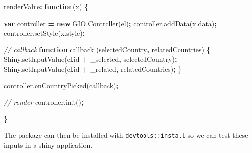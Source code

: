 \documentclass[
]{krantz}
\makeatletter
\newenvironment{Shaded}{\begin{snugshade}}{\end{snugshade}}
\newcommand{\AttributeTok}[1]{\textcolor[rgb]{0.61,0.61,0.61}{#1}}
\newcommand{\CommentTok}[1]{\textcolor[rgb]{0.37,0.37,0.37}{\textit{#1}}}
\newcommand{\KeywordTok}[1]{\textcolor[rgb]{0.27,0.27,0.27}{\textbf{#1}}}
\newcommand{\NormalTok}[1]{#1}
\newcommand{\OperatorTok}[1]{\textcolor[rgb]{0.43,0.43,0.43}{\textbf{#1}}}
\newcommand{\StringTok}[1]{\textcolor[rgb]{0.5,0.5,0.5}{#1}}
\newcommand{\VariableTok}[1]{\textcolor[rgb]{0,0,0}{#1}}
\newenvironment{kframe}{%
\medskip{}
\setlength{\fboxsep}{.8em}
 \def\at@end@of@kframe{}%
 \ifinner\ifhmode%
  \def\at@end@of@kframe{\end{minipage}}%
  \begin{minipage}{\columnwidth}%
 \fi\fi%
 \def\FrameCommand##1{\hskip\@totalleftmargin \hskip-\fboxsep
 \colorbox{shadecolor}{##1}\hskip-\fboxsep
     \hskip-\linewidth \hskip-\@totalleftmargin \hskip\columnwidth}%
 \MakeFramed {\advance\hsize-\width
   \@totalleftmargin\z@ \linewidth\hsize
   \@setminipage}}%
 {\par\unskip\endMakeFramed%
 \at@end@of@kframe}
\renewenvironment{Shaded}{\begin{kframe}}{\end{kframe}}
\makeatother
\begin{document}
\begin{Shaded}
\begin{Highlighting}[]
\NormalTok{renderValue}\OperatorTok{:} \KeywordTok{function}\NormalTok{(x) }\OperatorTok{\{}

  \KeywordTok{var}\NormalTok{ controller }\OperatorTok{=} \KeywordTok{new} \VariableTok{GIO}\NormalTok{.}\AttributeTok{Controller}\NormalTok{(el)}\OperatorTok{;}
  \VariableTok{controller}\NormalTok{.}\AttributeTok{addData}\NormalTok{(}\VariableTok{x}\NormalTok{.}\AttributeTok{data}\NormalTok{)}\OperatorTok{;}
  \VariableTok{controller}\NormalTok{.}\AttributeTok{setStyle}\NormalTok{(}\VariableTok{x}\NormalTok{.}\AttributeTok{style}\NormalTok{)}\OperatorTok{;}

  \CommentTok{// callback}
  \KeywordTok{function} \AttributeTok{callback}\NormalTok{ (selectedCountry}\OperatorTok{,}\NormalTok{ relatedCountries) }\OperatorTok{\{}
    \VariableTok{Shiny}\NormalTok{.}\AttributeTok{setInputValue}\NormalTok{(}\VariableTok{el}\NormalTok{.}\AttributeTok{id} \OperatorTok{+} \StringTok{\textquotesingle{}\_selected\textquotesingle{}}\OperatorTok{,}\NormalTok{ selectedCountry)}\OperatorTok{;}
    \VariableTok{Shiny}\NormalTok{.}\AttributeTok{setInputValue}\NormalTok{(}\VariableTok{el}\NormalTok{.}\AttributeTok{id} \OperatorTok{+} \StringTok{\textquotesingle{}\_related\textquotesingle{}}\OperatorTok{,}\NormalTok{ relatedCountries)}\OperatorTok{;}
  \OperatorTok{\}}

  \VariableTok{controller}\NormalTok{.}\AttributeTok{onCountryPicked}\NormalTok{(callback)}\OperatorTok{;}

  \CommentTok{// render}
  \VariableTok{controller}\NormalTok{.}\AttributeTok{init}\NormalTok{()}\OperatorTok{;}

\OperatorTok{\}}
\end{Highlighting}
\end{Shaded}

The package can then be installed with \texttt{devtools::install} so we can test these inputs in a shiny application.
\end{document}
